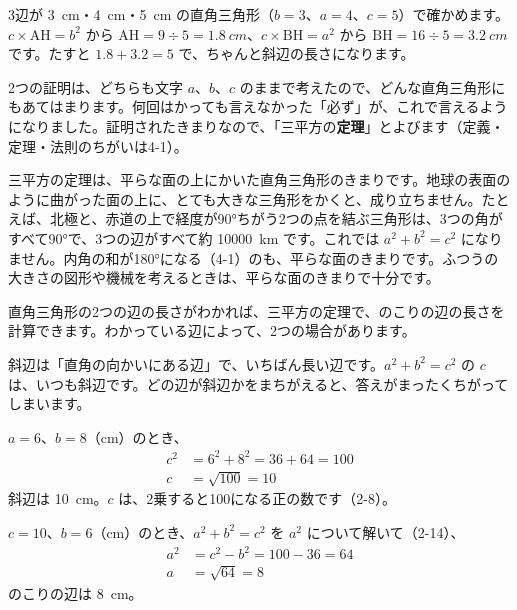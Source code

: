 3辺が \qty{3}{cm}・\qty{4}{cm}・\qty{5}{cm} の直角三角形（$b=3$、$a=4$、$c=5$）で確かめます。$c\times\mathrm{AH}=b^2$ から $\mathrm{AH}=9\div5=\qty{1.8}{cm}$、$c\times\mathrm{BH}=a^2$ から $\mathrm{BH}=16\div5=\qty{3.2}{cm}$ です。たすと $1.8+3.2=5$ で、ちゃんと斜辺の長さになります。

2つの証明は、どちらも文字 $a$、$b$、$c$ のままで考えたので、どんな直角三角形にもあてはまります。何回はかっても言えなかった「必ず」が、これで言えるようになりました。証明されたきまりなので、「三平方の\textbf{定理}」とよびます（定義・定理・法則のちがいは4-1）。

\begin{seikaku}
三平方の定理は、平らな面の上にかいた直角三角形のきまりです。地球の表面のように曲がった面の上に、とても大きな三角形をかくと、成り立ちません。たとえば、北極と、赤道の上で経度が90°ちがう2つの点を結ぶ三角形は、3つの角がすべて90°で、3つの辺がすべて約 \qty{10000}{km} です。これでは $a^2+b^2=c^2$ になりません。内角の和が180°になる（4-1）のも、平らな面のきまりです。ふつうの大きさの図形や機械を考えるときは、平らな面のきまりで十分です。
\end{seikaku}

\label{bk:4-4:motomeru}直角三角形の2つの辺の長さがわかれば、三平方の定理で、のこりの辺の長さを計算できます。わかっている辺によって、2つの場合があります。

斜辺は「直角の向かいにある辺」で、いちばん長い辺です。$a^2+b^2=c^2$ の $c$ は、いつも斜辺です。どの辺が斜辺かをまちがえると、答えがまったくちがってしまいます。

\noindent\begin{minipage}[c]{0.49\linewidth}
$a=6$、$b=8$（cm）のとき、
\begin{align*}
c^2&=6^2+8^2=36+64=100\\
c&=\sqrt{100}=10
\end{align*}
斜辺は \qty{10}{cm}。$c$ は、2乗すると100になる正の数です（2-8）。
\end{minipage}\hfill
\begin{minipage}[c]{0.49\linewidth}
$c=10$、$b=6$（cm）のとき、$a^2+b^2=c^2$ を $a^2$ について解いて（2-14）、
\begin{align*}
a^2&=c^2-b^2=100-36=64\\
a&=\sqrt{64}=8
\end{align*}
のこりの辺は \qty{8}{cm}。
\end{minipage}

